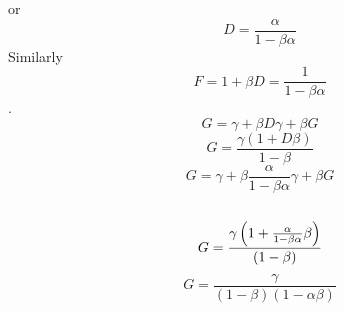 \documentclass[11pt]{article}
\begin{document}
\begin{enumerate}
\begin{enumerate}
or 
\begin{equation*}
D=\frac{\alpha }{1-\beta \alpha }
\end{equation*}%
Similarly%
\begin{equation*}
F=1+\beta D=\frac{1}{1-\beta \alpha }
\end{equation*}%
$.$%
\begin{equation*}
G=\gamma +\beta D\gamma +\beta G
\end{equation*}%
\begin{equation*}
G=\frac{\gamma \left( 1+D\beta \right) }{1-\beta }
\end{equation*}%
\begin{equation*}
G=\gamma +\beta \frac{\alpha }{1-\beta \alpha }\gamma +\beta G
\end{equation*}%
$\allowbreak $%
\begin{equation*}
G=\frac{\gamma \left( 1+\frac{\alpha }{1-\beta \alpha }\beta \right) }{%
\left( 1-\beta \right) }
\end{equation*}%
\begin{equation*}
G=\frac{\gamma }{\left( 1-\beta \right) \left( 1-\alpha \beta \right) }
\end{equation*}
\end{enumerate}
\end{enumerate}
\end{document}

